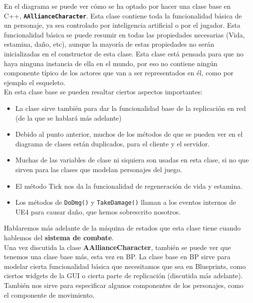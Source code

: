 En el diagrama se puede ver cómo se ha optado por hacer una clase base en C++, \texttt{\textbf{AAllianceCharacter}}. Esta clase contiene toda la funcionalidad básica de un personaje, ya sea controlado por inteligencia artificial o por el jugador. Esta funcionalidad básica se puede resumir en todas las propiedades necesarias (Vida, estamina, daño, etc), aunque la mayoría de estas propiedades no serán inicializadas en el constructor de esta clase. Esta clase está pensada para que no haya ninguna instancia de ella en el mundo, por eso no contiene ningún componente típico de los actores que van a ser representados en él, como por ejemplo el esqueleto.
\\

En esta clase base se pueden resaltar ciertos aspectos importantes:
\begin{itemize}
\item La clase sirve también para dar la funcionalidad base de la replicación en red (de la que se hablará más adelante)
\item Debido al punto anterior, muchos de los métodos de que se pueden ver en el diagrama de clases están duplicados, para el cliente y el servidor.
\item Muchas de las variables de clase ni siquiera son usadas en esta clase, si no que sirven para las clases que modelan personajes del juego.
\item El método Tick nos da la funcionalidad de regeneración de vida y estamina.
\item Los métodos de \texttt{DoDmg()} y \texttt{TakeDamage()} llaman a los eventos internos de \ac{UE4} para causar daño, que hemos sobrescrito nosotros.
\end{itemize}


Hablaremos más adelante de la máquina de estados que esta clase tiene cuando hablemos del \textbf{sistema de combate}.
\\

Una vez discutida la clase \textbf{AAllianceCharacter}, también se puede ver que tenemos una clase base más, esta vez en \ac{BP}. La clase base en \ac{BP} sirve para modelar cierta funcionalidad básica que necesitamos que sea en Blueprints, como ciertos widgets de la \ac{GUI} o cierta parte de replicación (discutida más adelante). También nos sirve para especificar algunos componentes de los personajes, como el componente de movimiento.
\\

